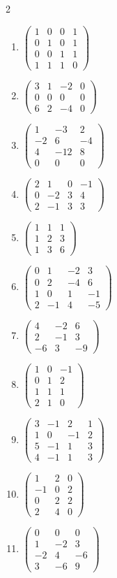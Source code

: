 \begin{multicols}{2}
\begin{enumerate}[label=\arabic*.,  leftmargin=*]
\item $\begin{pmatrix}1&0&0&1\\0&1&0&1\\0&0&1&1\\1&1&1&0\end{pmatrix}$
\item $\begin{pmatrix}3&1&-2&0\\0&0&0&0\\6&2&-4&0\end{pmatrix}$
\item $\begin{pmatrix}1&-3&2\\-2&6&-4\\4&-12&8\\0&0&0\end{pmatrix}$
\item $\begin{pmatrix}2&1&0&-1\\0&-2&3&4\\2&-1&3&3\end{pmatrix}$
\item $\begin{pmatrix}1&1&1\\1&2&3\\1&3&6\end{pmatrix}$
\item $\begin{pmatrix}0&1&-2&3\\0&2&-4&6\\1&0&1&-1\\2&-1&4&-5\end{pmatrix}$
\item $\begin{pmatrix}4&-2&6\\2&-1&3\\-6&3&-9\end{pmatrix}$
\item $\begin{pmatrix}1&0&-1\\0&1&2\\1&1&1\\2&1&0\end{pmatrix}$
\item $\begin{pmatrix}3&-1&2&1\\1&0&-1&2\\5&-1&1&3\\4&-1&1&3\end{pmatrix}$
\item $\begin{pmatrix}1&2&0\\-1&0&2\\0&2&2\\2&4&0\end{pmatrix}$
\item $\begin{pmatrix}0&0&0\\1&-2&3\\-2&4&-6\\3&-6&9\end{pmatrix}$
\end{enumerate}
\end{multicols}
